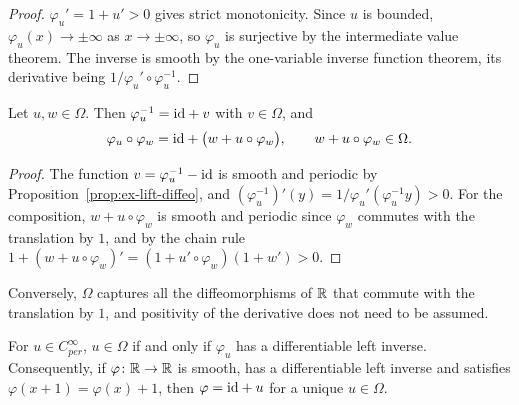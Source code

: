 \begin{proof}
  \leanok
  $\varphi_u' = 1 + u' > 0$ gives strict monotonicity. Since $u$ is bounded, $\varphi_u(x) \to
  \pm\infty$ as $x \to \pm\infty$, so $\varphi_u$ is surjective by the intermediate value
  theorem. The inverse is smooth by the one-variable inverse function theorem, its derivative
  being $1/\varphi_u' \circ \varphi_u^{-1}$.
\end{proof}

\begin{theorem}
  \label{thm:ex-omega-group}
  \leanok
  Let $u, w \in \Omega$. Then $\varphi_u^{-1} = \mathrm{id} + v$ with $v \in \Omega$, and
  \[
    \varphi_u \circ \varphi_w = \mathrm{id} + \bigl(w + u \circ \varphi_w\bigr), \qquad
    w + u \circ \varphi_w \in \Omega .
  \]
\end{theorem}

\begin{proof}
  \leanok
  The function $v = \varphi_u^{-1} - \mathrm{id}$ is smooth and periodic by
  Proposition~\ref{prop:ex-lift-diffeo}, and $(\varphi_u^{-1})'(y) =
  1/\varphi_u'(\varphi_u^{-1}y) > 0$. For the composition, $w + u \circ \varphi_w$ is smooth and
  periodic since $\varphi_w$ commutes with the translation by $1$, and by the chain rule
  $1 + (w + u \circ \varphi_w)' = (1 + u' \circ \varphi_w)(1 + w') > 0$.
\end{proof}

Conversely, $\Omega$ captures all the diffeomorphisms of $\mathbb{R}$ that commute with the
translation by $1$, and positivity of the derivative does not need to be assumed.

\begin{theorem}
  \label{thm:ex-omega-characterization}
  \leanok
  For $u \in C^\infty_{per}$, $u \in \Omega$ if and only if $\varphi_u$ has a differentiable
  left inverse. Consequently, if $\varphi \colon \mathbb{R} \to \mathbb{R}$ is smooth, has a differentiable left
  inverse and satisfies $\varphi(x + 1) = \varphi(x) + 1$, then $\varphi = \mathrm{id} + u$ for a unique
  $u \in \Omega$.
\end{theorem}

